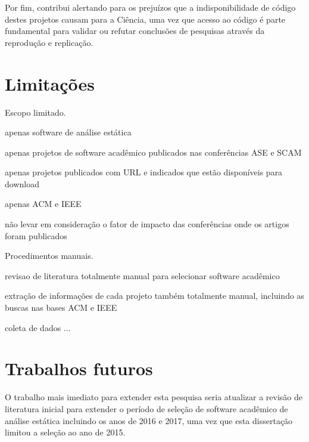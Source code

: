 
Por fim, contribui alertando para os prejuízos que a indisponibilidade de
código destes projetos causam para a Ciência, uma vez que acesso ao código é
parte fundamental para validar ou refutar conclusões de pesquisas através da
reprodução e replicação.



\section{Limitações}

Escopo limitado.

apenas software de análise estática

apenas projetos de software acadêmico publicados nas conferências ASE e SCAM

apenas projetos publicados com URL e indicados que estão disponíveis para download

apenas ACM e IEEE

não levar em consideração o fator de impacto das conferências onde os artigos foram publicados

Procedimentos manuais.

revisao de literatura totalmente manual para selecionar software acadêmico

extração de informações de cada projeto também totalmente manual, incluindo as buscas nas bases ACM e IEEE

coleta de dados ...


\section{Trabalhos futuros}


O trabalho mais imediato para extender esta pesquisa seria atualizar a revisão
de literatura inicial para extender o período de seleção de software acadêmico
de análise estática incluindo os anos de 2016 e 2017, uma vez que esta
dissertação limitou a seleção ao ano de 2015.


